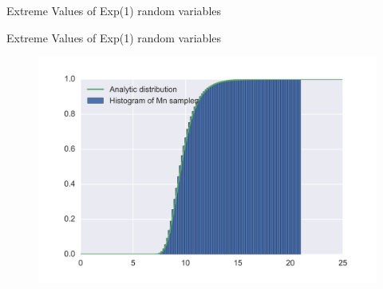 \documentclass[10pt]{beamer}
\begin{document}
\begin{frame}{Extreme Values of Exp(1) random variables}

\end{frame}

\begin{frame}{Extreme Values of Exp(1) random variables}
\begin{figure}[h]
\centering
\includegraphics[scale=0.75]{example1.png}
\end{figure}
\end{frame}
\end{document}
